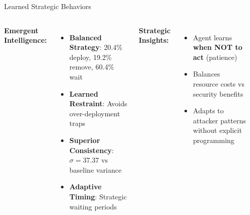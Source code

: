 \documentclass[aspectratio=169,xcolor=dvipsnames]{beamer}
\begin{document}
\begin{frame}{Learned Strategic Behaviors}
\begin{columns}[c]
\textbf{\textcolor{ImperialBlue}{Emergent Intelligence:}}
\begin{itemize}
    \item \textbf{Balanced Strategy}: 20.4\% deploy, 19.2\% remove, 60.4\% wait
    \item \textbf{Learned Restraint}: Avoids over-deployment traps
    \item \textbf{Superior Consistency}: $\sigma = 37.37$ vs baseline variance
    \item \textbf{Adaptive Timing}: Strategic waiting periods
\end{itemize}

\textbf{\textcolor{cwDecoy}{Strategic Insights:}}
\begin{itemize}
    \item Agent learns \textbf{when NOT to act} (patience)
    \item Balances resource costs vs security benefits
    \item Adapts to attacker patterns without explicit programming
\end{itemize}

\begin{center}
\end{center}
\end{columns}
\end{frame}
\end{document}
